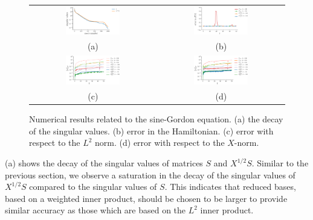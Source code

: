 \begin{figure} \label{fig:2}
\begin{tabular}{cc}
\includegraphics[width=0.45\textwidth]{./figs/sine/singulars} & \includegraphics[width=0.45\textwidth]{./figs/sine/energy} \\
(a) & (b) \\
\includegraphics[width=0.45\textwidth]{./figs/sine/l2} & \includegraphics[width=0.45\textwidth]{./figs/sine/energy_norm} \\
(c) & (d) \\
\end{tabular}
\caption{Numerical results related to the sine-Gordon equation. (a) the decay of the singular values. (b) error in the Hamiltonian. (c) error with respect to the $L^2$ norm. (d) error with respect to the $X$-norm.}
\end{figure}

(a) shows the decay of the singular values of matrices $S$ and $X^{1/2}S$. Similar to the previous section, we observe a saturation in the decay of the singular values of $X^{1/2}S$ compared to the singular values of $S$. This indicates that reduced bases, based on a weighted inner product, should be chosen to be larger to provide similar accuracy as those which are based on the $L^2$ inner product.

